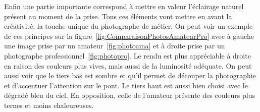 \documentclass[11pt, french,screen]{report-rd-info}
\begin{document}
Enfin une partie importante correspond à mettre en valeur l'éclairage naturel présent au moment de la prise. Tous ces éléments vont mettre en avant la créativité, la touche unique du photographe de métier.
On peut voir un exemple de ces principes sur la figure~\ref{fig:ComparaisonPhotosAmateurPro} avec à gauche une image prise par un amateur~\ref{fig:photoama} et à droite prise par un photographe professionnel~\ref{fig:photopro}. Le rendu est plus appréciable à droite en raison des couleurs plus vives, mais aussi de la luminosité adéquate. On peut aussi voir que le tiers bas est sombre et qu’il permet de découper la photographie et d’accentuer l’attention sur le pont. Le tiers haut est aussi bien choisi avec le dégradé bleu du ciel. En opposition, celle de l’amateur présente des couleurs plus ternes et moins chaleureuses.
\begin{figure}[htp]
 \centering

\end{figure}
\end{document}

